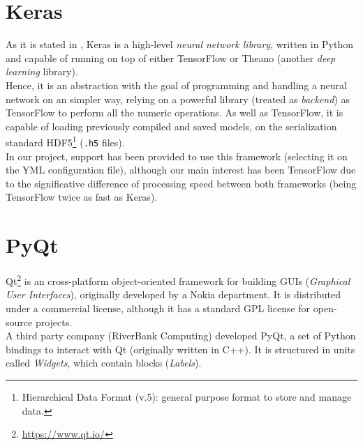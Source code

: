 \section{Keras}
	As it is stated in \cite{dpascualhe}, Keras is a high-level \emph{neural network library}, written in Python and capable of running on top of either TensorFlow or Theano (another \emph{deep learning} library).\\
	
	Hence, it is an abstraction with the goal of programming and handling a neural network on an simpler way, relying on a powerful library (treated as \emph{backend}) as TensorFlow to perform all the numeric operations. As well as TensorFlow, it is capable of loading previously compiled and saved models, on the serialization standard HDF5\footnote{Hierarchical Data Format (v.5): general purpose format to store and manage data.} (\texttt{.h5} files).\\
	
	In our project, support has been provided to use this framework (selecting it on the YML configuration file), although our main interest has been TensorFlow due to the significative difference of processing speed between both frameworks (being TensorFlow twice as fast as Keras).
\section{PyQt}
	Qt\footnote{\url{https://www.qt.io/}} is an cross-platform object-oriented framework for building GUIs (\emph{Graphical User Interfaces}), originally developed by a Nokia department. It is distributed under a commercial license, although it has a standard GPL license for open-source projects.\\
	
	A third party company (RiverBank Computing) developed PyQt, a set of Python bindings to interact with Qt (originally written in C++). It is structured in units called \emph{Widgets}, which contain blocks (\emph{Labels}).\\
	
